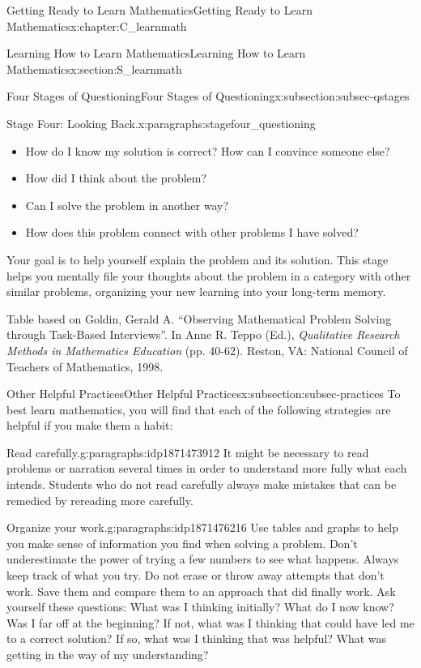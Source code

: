 \documentclass[oneside,10pt,]{book}
\newcommand{\pubtitle}[1]{\textsl{#1}}
\numberwithin{equation}{chapter}
\begin{document}
\begin{chapterptx}{Getting Ready to Learn Mathematics}{}{Getting Ready to Learn Mathematics}{}{}{x:chapter:C_learnmath}
\begin{sectionptx}{Learning How to Learn Mathematics}{}{Learning How to Learn Mathematics}{}{}{x:section:S_learnmath}
\begin{subsectionptx}{Four Stages of Questioning}{}{Four Stages of Questioning}{}{}{x:subsection:subsec-qstages}
\begin{paragraphs}{Stage Four: Looking Back.}{x:paragraphs:stagefour_questioning}
\par
%
\begin{itemize}[label=\textbullet]
\item{}How do I know my solution is correct? How can I convince someone else?%
\item{}How did I think about the problem?%
\item{}Can I solve the problem in another way?%
\item{}How does this problem connect with other problems I have solved?%
\end{itemize}
%
\par
Your goal is to help yourself explain the problem and its solution. This stage helps you mentally file your thoughts about the problem in a category with other similar problems, organizing your new learning into your long-term memory.%
\par
Table based on Goldin, Gerald A. ``Observing Mathematical Problem Solving through Task-Based Interviews''. In Anne R. Teppo (Ed.), \pubtitle{Qualitative Research Methods in Mathematics Education} (pp. 40-62). Reston, VA: National Council of Teachers of Mathematics, 1998.%
\end{paragraphs}%
\end{subsectionptx}
%
%
\typeout{************************************************}
\typeout{************************************************}
%
\begin{subsectionptx}{Other Helpful Practices}{}{Other Helpful Practices}{}{}{x:subsection:subsec-practices}
To best learn mathematics, you will find that each of the following strategies are helpful if you make them a habit:%
\begin{paragraphs}{Read carefully.}{g:paragraphs:idp1871473912}%
It might be necessary to read problems or narration several times in order to understand more fully what each intends. Students who do not read carefully always make mistakes that can be remedied by rereading more carefully.%
\end{paragraphs}%
\begin{paragraphs}{Organize your work.}{g:paragraphs:idp1871476216}%
Use tables and graphs to help you make sense of information you find when solving a problem. Don't underestimate the power of trying a few numbers to see what happens. Always keep track of what you try. Do not erase or throw away attempts that don't work. Save them and compare them to an approach that did finally work. Ask yourself these questions: What was I thinking initially? What do I now know? Was I far off at the beginning? If not, what was I thinking that could have led me to a correct solution? If so, what was I thinking that was helpful? What was getting in the way of my understanding?%

\end{paragraphs}
\end{subsectionptx}
\end{sectionptx}
\end{chapterptx}
\end{document}
